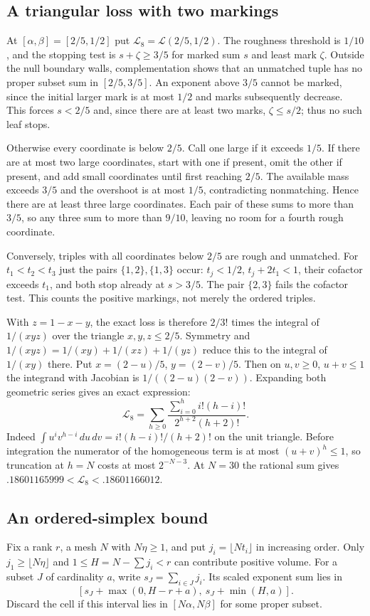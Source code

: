 \documentclass[11pt,a4paper]{article}
\theoremstyle{paperplain}
\numberwithin{equation}{section}
\begin{document}
\subsection{A triangular loss with two markings}\label{cost:octal}
At $[\alpha,\beta]=[2/5,1/2]$ put $\mathscr L_8=\mathscr L(2/5,1/2)$.
The roughness threshold is $1/10$, and the
stopping test is $s+\zeta\ge3/5$ for marked sum $s$ and least mark
$\zeta$. Outside the null boundary walls, complementation shows that an unmatched tuple
has no proper subset sum in $[2/5,3/5]$. An exponent above $3/5$
cannot be marked, since the initial larger mark is at most $1/2$ and
marks subsequently decrease. This forces $s<2/5$ and, since there
are at least two marks, $\zeta\le s/2$; thus no such leaf stops.


Otherwise every coordinate is below $2/5$. Call one large if it exceeds
$1/5$. If there are at most two large coordinates, start with one
if present, omit the other if present, and add small coordinates until
first reaching $2/5$. The available mass exceeds $3/5$ and the
overshoot is at most $1/5$, contradicting nonmatching. Hence there
are at least three large coordinates. Each pair of these sums to more
than $3/5$, so any three sum to more than $9/10$, leaving no room for
a fourth rough coordinate. 

Conversely, triples with all coordinates
below $2/5$ are rough and unmatched. For $t_1<t_2<t_3$ just the
pairs $\{1,2\},\{1,3\}$ occur: $t_j<1/2$, $t_j+2t_1<1$, their
cofactor exceeds $t_1$, and both stop already at $s>3/5$. The pair
$\{2,3\}$ fails the cofactor test. This counts the positive markings,
not merely the ordered triples.

With $z=1-x-y$, the exact loss is therefore $2/3!$ times the integral
of $1/(xyz)$ over the triangle $x,y,z\le2/5$. Symmetry and
$1/(xyz)=1/(xy)+1/(xz)+1/(yz)$ reduce this to the integral of
$1/(xy)$ there. Put $x=(2-u)/5$, $y=(2-v)/5$. Then on
$u,v\ge0$, $u+v\le1$ the integrand with Jacobian is
$1/((2-u)(2-v))$. Expanding both geometric series gives an exact expression:
\[
 \mathscr L_8=\sum_{h\ge0}
 \frac{\sum_{i=0}^h i!(h-i)!}{2^{h+2}(h+2)!}.
\]
Indeed $\int u^iv^{h-i}\,du\,dv=i!(h-i)!/(h+2)!$ on the unit
triangle. Before integration the numerator of the homogeneous term
is at most $(u+v)^h\le1$, so truncation at $h=N$ costs at most
$2^{-N-3}$. At $N=30$ the rational sum gives
$.18601165999<\mathscr L_8<.18601166012$.


\subsection{An ordered-simplex bound}
Fix a rank $r$, a mesh $N$ with $N\eta\ge1$, and put $j_i=\lfloor Nt_i\rfloor$
in increasing order. Only $j_1\ge\lfloor N\eta\rfloor$ and
$1\le H=N-\sum j_i<r$ can contribute positive volume.
For a subset \(J\) of cardinality \(a\), write \(s_J=\sum_{i\in J}j_i\).
Its scaled exponent sum lies in
\begin{equation}
    \left[s_J+\max(0,H-r+a),\ s_J+\min(H,a)\right].
 \label{dt:sieve-subset-cell}
\end{equation}
Discard the cell if this interval lies in
\([N\alpha,N\beta]\) for some proper subset.
\end{document}
